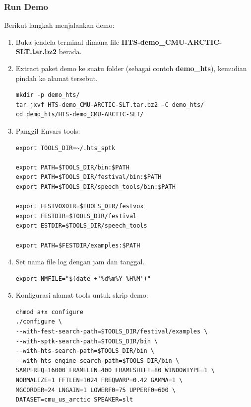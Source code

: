 \documentclass[12pt,]{article}
\begin{document}
	\subsubsection{Run Demo}
	Berikut langkah menjalankan demo:
	
	\begin{enumerate}
		\item Buka jendela terminal dimana file \textbf{HTS-demo\_CMU-ARCTIC-SLT.tar.bz2} berada.
		
		\item Extract paket demo ke suatu folder (sebagai contoh \textbf{demo\_hts}), kemudian pindah ke alamat tersebut.
		\begin{verbatim}
mkdir -p demo_hts/
tar jxvf HTS-demo_CMU-ARCTIC-SLT.tar.bz2 -C demo_hts/
cd demo_hts/HTS-demo_CMU-ARCTIC-SLT/
		\end{verbatim}
		
		\item Panggil Envars tools:
		\begin{verbatim}
export TOOLS_DIR=~/.hts_sptk

export PATH=$TOOLS_DIR/bin:$PATH
export PATH=$TOOLS_DIR/festival/bin:$PATH
export PATH=$TOOLS_DIR/speech_tools/bin:$PATH

export FESTVOXDIR=$TOOLS_DIR/festvox
export FESTDIR=$TOOLS_DIR/festival
export ESTDIR=$TOOLS_DIR/speech_tools

export PATH=$FESTDIR/examples:$PATH
		\end{verbatim}
		
		\newpage
		\item Set nama file log dengan jam dan tanggal.
		\begin{verbatim}
export NMFILE="$(date +'%d%m%Y_%H%M')"
		\end{verbatim}
		
		\item Konfigurasi alamat tools untuk skrip demo:
		\begin{verbatim}
chmod a+x configure
./configure \
--with-fest-search-path=$TOOLS_DIR/festival/examples \
--with-sptk-search-path=$TOOLS_DIR/bin \
--with-hts-search-path=$TOOLS_DIR/bin \
--with-hts-engine-search-path=$TOOLS_DIR/bin \
SAMPFREQ=16000 FRAMELEN=400 FRAMESHIFT=80 WINDOWTYPE=1 \
NORMALIZE=1 FFTLEN=1024 FREQWARP=0.42 GAMMA=1 \
MGCORDER=24 LNGAIN=1 LOWERF0=75 UPPERF0=600 \
DATASET=cmu_us_arctic SPEAKER=slt
		\end{verbatim}


\end{enumerate}
\end{document}
